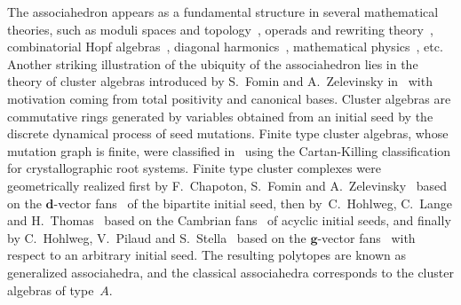 \documentclass{amsart}
\theoremstyle{definition}
\renewcommand{\b}[1]{{\boldsymbol{#1}}} %
\begin{document}
The associahedron appears as a fundamental structure in several mathematical theories, such as moduli spaces and topology~\cite{Stasheff, Keller-AinfinityAlgebras}, operads and rewriting theory~\cite{}, combinatorial Hopf algebras~\cite{LodayRonco, ChatelPilaud, Pilaud-brickAlgebra}, diagonal harmonics~\cite{}, mathematical physics~\cite{ArkaniHamedBaiHeYan}, etc.
Another striking illustration of the ubiquity of the associahedron lies in the theory of cluster algebras introduced by S.~Fomin and A.~Zelevinsky in~\cite{FominZelevinsky-ClusterAlgebrasI} with motivation coming from total positivity and canonical bases.
Cluster algebras are commutative rings generated by variables obtained from an initial seed by the discrete dynamical process of seed mutations.
Finite type cluster algebras, whose mutation graph is finite, were classified in~\cite{FominZelevinsky-ClusterAlgebrasII} using the Cartan-Killing classification for crystallographic root systems.
Finite type cluster complexes were geometrically realized first by F.~Chapoton, S.~Fomin and A.~Zelevinsky~\cite{ChapotonFominZelevinsky} based on the $\b{d}$-vector fans~\cite{FominZelevinsky-YSystems, FominZelevinsky-ClusterAlgebrasII} of the bipartite initial seed, then by~C.~Hohlweg, C.~Lange and H.~Thomas~\cite{HohlwegLangeThomas} based on the Cambrian fans~\cite{Reading-CambrianLattices, ReadingSpeyer} of acyclic initial seeds, and finally by C.~Hohlweg, V.~Pilaud and S.~Stella~\cite{HohlwegPilaudStella} based on the $\b{g}$-vector fans~\cite{FominZelevinsky-ClusterAlgebrasIV} with respect to an arbitrary initial seed.
The resulting polytopes are known as generalized associahedra, and the classical associahedra corresponds to the cluster algebras of type~$A$.
\end{document}
